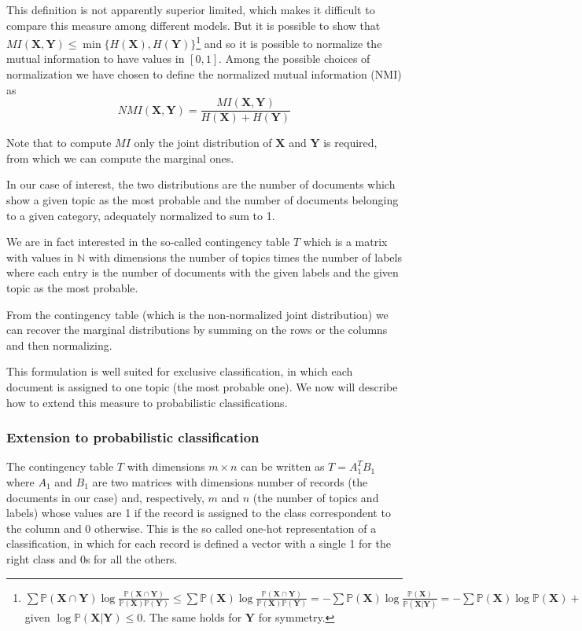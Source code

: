 \documentclass[11pt, a4paper, oneside, openright]{book}
\begin{document}
This definition is not apparently superior limited, which makes it difficult to compare this measure among different models. But it is possible to show that $MI(\mathbf{X},\mathbf{Y}) \leq \min\{H(\mathbf{X}),H(\mathbf{Y})\}$\footnote{$
	\sum \mathbb{P}(\mathbf{X}\cap\mathbf{Y}) \log\frac{\mathbb{P}(\mathbf{X}\cap\mathbf{Y})}{\mathbb{P}(\mathbf{X})\mathbb{P}(\mathbf{Y})} 
	\leq \sum \mathbb{P}(\mathbf{X}) \log\frac{\mathbb{P}(\mathbf{X}\cap\mathbf{Y})}{\mathbb{P}(\mathbf{X})\mathbb{P}(\mathbf{Y})} 
	= - \sum \mathbb{P}(\mathbf{X}) \log\frac{\mathbb{P}(\mathbf{X})}{\mathbb{P}(\mathbf{X}|\mathbf{Y})}
	= - \sum \mathbb{P}(\mathbf{X}) \log \mathbb{P}(\mathbf{X}) + \sum \mathbb{P}(\mathbf{X}) \log {\mathbb{P}(\mathbf{X}|\mathbf{Y})}
	= H(\mathbf{X}) + \sum \mathbb{P}(\mathbf{X}) \log {\mathbb{P}(\mathbf{X}|\mathbf{Y})}
\leq H(\mathbf{X})$ given $\log {\mathbb{P}(\mathbf{X}|\mathbf{Y})} \leq 0$. The same holds for $\mathbf{Y}$ for symmetry.} and so it is possible to normalize the mutual information to have values in $[0,1]$. Among the possible choices of normalization \parencite[see][]{vinh2010} we have chosen to define the normalized mutual information (NMI) as
$$NMI(\mathbf{X},\mathbf{Y}) = \frac{MI(\mathbf{X},\mathbf{Y})}{H(\mathbf{X}) + H(\mathbf{Y})}$$

Note that to compute $MI$ only the joint distribution of $\mathbf{X}$ and $\mathbf{Y}$ is required, from which we can compute the marginal ones.

In our case of interest, the two distributions are the number of documents which show a given topic as the most probable and the number of documents belonging to a given category, adequately normalized to sum to 1.

We are in fact interested in the so-called contingency table $T$ which is a matrix with values in $\mathbb{N}$ with dimensions the number of topics times the number of labels where each entry is the number of documents with the given labels and the given topic as the most probable.

From the contingency table (which is the non-normalized joint distribution) we can recover the marginal distributions by summing on the rows or the columns and then normalizing.

This formulation is well suited for exclusive classification, in which each document is assigned to one topic (the most probable one). We now will describe how to extend this measure to probabilistic classifications.

\subsubsection{Extension to probabilistic classification}
The contingency table $T$ with dimensions $m \times n$ can be written as $T = A_1^T B_1$ where $A_1$ and $B_1$ are two matrices with dimensions number of records (the documents in our case) and, respectively, $m$ and $n$ (the number of topics and labels) whose values are 1 if the record is assigned to the class correspondent to the column and 0 otherwise.
This is the so called one-hot representation of a classification, in which for each record is defined a vector with a single 1 for the right class and 0s for all the others.
\end{document}
